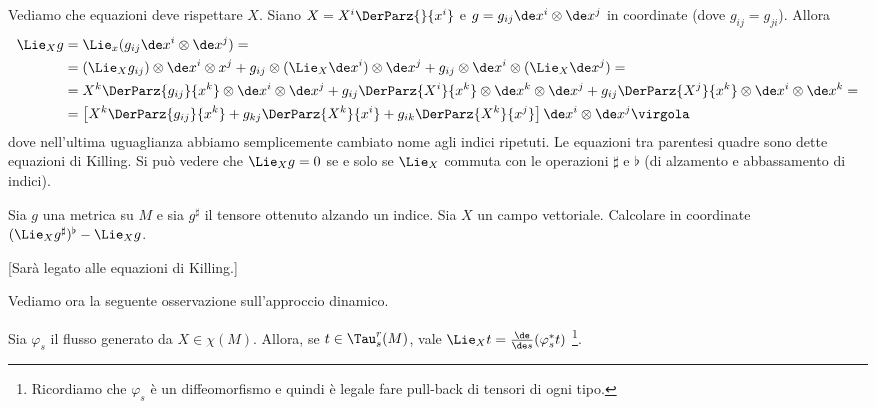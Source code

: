 \begin{example}
\begin{enumerate}
		Vediamo che equazioni deve rispettare $X$. Siano $X = X^i\DerParz{}{x^i}$ e $g = g_{ij}\de x^i \otimes \de x^j$ in coordinate (dove $g_{ij} = g_{ji}$).
		Allora
		\begin{align*}
		\Lie_Xg &= \Lie_x (g_{ij}\de x^i \otimes \de x^j) =\\
		&=(\Lie_Xg_{ij})\otimes \de x^i\otimes x^j + g_{ij} \otimes (\Lie_X\de x^i) \otimes \de x^j + g_{ij}\otimes \de x^i \otimes (\Lie_X\de x^j) =\\
		&= X^k \DerParz{g_{ij}}{x^k}\otimes \de x^i \otimes \de x^j + g_{ij}\DerParz{X^i}{x^k} \otimes \de x^k \otimes \de x^j + g_{ij} \DerParz{X^j}{x^k} \otimes \de x^i \otimes \de x^k =\\
		&= \left[X^k \DerParz{g_{ij}}{x^k} + g_{kj} \DerParz{X^k}{x^i} + g_{ik} \DerParz{X^k}{x^j} \right] \de x^i \otimes \de x^j \virgola
		\end{align*}
		dove nell'ultima uguaglianza abbiamo semplicemente cambiato nome agli indici ripetuti. Le equazioni tra parentesi quadre sono dette equazioni di Killing. Si può vedere che $\Lie_Xg=0$ se e solo se $\Lie_X$ commuta con le operazioni $\sharp$ e $\flat$ (di alzamento e abbassamento di indici).
	\end{enumerate}
\end{example}

\begin{exercise}
	Sia $g$ una metrica su $M$ e sia $g^{\sharp}$ il tensore ottenuto alzando un indice. Sia $X$ un campo vettoriale. Calcolare in coordinate $(\Lie_X g^\sharp)^\flat - \Lie_X g$.
	
	[Sarà legato alle equazioni di Killing.]
\end{exercise}


Vediamo ora la seguente osservazione sull'approccio dinamico.
\begin{remark}
	Sia $\varphi_s$ il flusso generato da $X\in\chi(M)$. Allora, se $t\in\Tau_s^r(M)$, vale $\Lie_Xt = \frac{\de}{\de s} (\varphi_s^* t)$ \footnote{Ricordiamo che $\varphi_s$ è un diffeomorfismo e quindi è legale fare pull-back di tensori di ogni tipo.}.
\end{remark}
